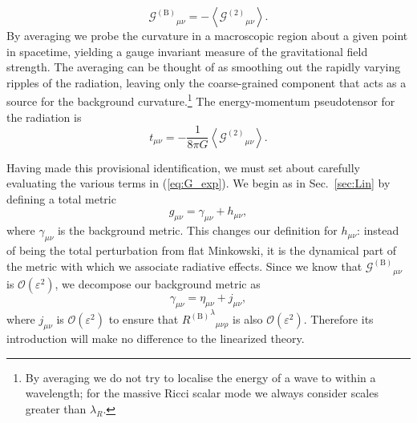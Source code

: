 \documentclass[aps,prd,amsfonts,amssymb,amsmath,nofootinbib,reprint,showpacs]{revtex4-1}
\newcommand{\eqnref}[1]{(\ref{eq:#1})}
\newcommand{\secref}[1]{Sec.\ \ref{sec:#1}}
\newcommand{\recip}[1]{\ensuremath{\frac{1}{#1}}}
\newcommand{\order}[1]{\ensuremath{\mathcal{O}({#1})}}
\begin{document}
\begin{equation}
{\mathcal{G}^{(\text{B})}}_{\mu\nu} = -\left\langle{\mathcal{G}^{(2)}}_{\mu\nu}\right\rangle.
\end{equation}
By averaging we probe the curvature in a macroscopic region about a given point in spacetime, yielding a gauge invariant measure of the gravitational field strength. The averaging can be thought of as smoothing out the rapidly varying ripples of the radiation, leaving only the coarse-grained component that acts as a source for the background curvature.\footnote{By averaging we do not try to localise the energy of a wave to within a wavelength; for the massive Ricci scalar mode we always consider scales greater than $\lambda_R$.} The energy-momentum pseudotensor for the radiation is
\begin{equation}
t_{\mu\nu} = -\recip{8\pi G}\left\langle{\mathcal{G}^{(\text{2})}}_{\mu\nu}\right\rangle.
\end{equation}

Having made this provisional identification, we must set about carefully evaluating the various terms in \eqnref{G_exp}. We begin as in \secref{Lin} by defining a total metric
\begin{equation}
g_{\mu\nu} = \gamma_{\mu\nu} + h_{\mu\nu},
\end{equation}
where $\gamma_{\mu\nu}$ is the background metric. This changes our definition for $h_{\mu\nu}$: instead of being the total perturbation from flat Minkowski, it is the dynamical part of the metric with which we associate radiative effects. Since we know that ${\mathcal{G}^{(\text{B})}}_{\mu\nu}$ is $\order{\varepsilon^2}$, we decompose our background metric as
\begin{equation}
\gamma_{\mu\nu} = \eta_{\mu\nu} + j_{\mu\nu},
\end{equation}
where $j_{\mu\nu}$ is $\order{\varepsilon^2}$ to ensure that ${{R^{(\text{B})}}^\lambda}_{\mu\nu\rho}$ is also $\order{\varepsilon^2}$. Therefore its introduction will make no difference to the linearized theory.
\end{document}
